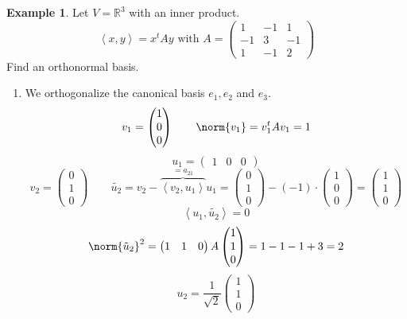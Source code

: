 \documentclass[a4paper,landscape,twocolumn]{article}
\newcommand\functional[1]{\left\langle{#1}\right\rangle}
\theoremstyle{definition}
\newtheorem{ex}{Example}
\DeclarePairedDelimiter\norm\lVert\rVert
\begin{document}
\begin{ex}
  Let $V = \mathbb R^3$ with an inner product.
  \[ \functional{x,y} = x^t A y \text{ with } A = \begin{pmatrix} 1 & -1 & 1 \\ -1 & 3 & -1 \\ 1 & -1 & 2 \end{pmatrix} \]
  Find an orthonormal basis.

  \begin{enumerate}
    \item We orthogonalize the canonical basis $e_1, e_2$ and $e_3$.
    \[
      v_1 = \begin{pmatrix} 1 \\ 0 \\ 0 \end{pmatrix}
      \qquad \norm{v_1} = v_1^t A v_1 = 1
    \] \[
      u_1 = \begin{pmatrix} 1 & 0 & 0 \end{pmatrix}
    \]
    \[
      v_2 = \begin{pmatrix} 0 \\ 1 \\ 0 \end{pmatrix}
      \qquad
      \tilde{u_2} = v_2 - \overbrace{\functional{v_2, u_1}}^{=a_{21}} u_1
      = \begin{pmatrix} 0 \\ 1 \\ 0 \end{pmatrix} - (-1) \cdot
      \begin{pmatrix} 1 \\ 0 \\ 0 \end{pmatrix} = \begin{pmatrix} 1 \\ 1 \\ 0 \end{pmatrix}
    \] \[
      \functional{u_1, \tilde{u_2}} = 0
    \] \[
      \norm{\tilde{u}_2}^2 = \begin{pmatrix} 1 & 1 & 0 \end{pmatrix} A \begin{pmatrix} 1 \\ 1 \\ 0 \end{pmatrix} = 1 - 1 - 1 + 3 = 2
    \] \[
      u_2 = \frac{1}{\sqrt{2}} \begin{pmatrix} 1 \\ 1 \\ 0 \end{pmatrix}
\]
\end{enumerate}
\end{ex}
\end{document}
